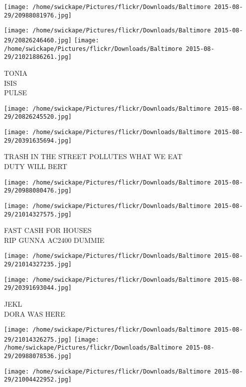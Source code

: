 \documentclass[10pt,letterpaper]{article}
\begin{document}
\texttt{[image: /home/swickape/Pictures/flickr/Downloads/Baltimore 2015-08-29/20988081976.jpg]}

\vspace{0.25in}
\texttt{[image: /home/swickape/Pictures/flickr/Downloads/Baltimore 2015-08-29/20826246460.jpg]}
\texttt{[image: /home/swickape/Pictures/flickr/Downloads/Baltimore 2015-08-29/21021886261.jpg]}

TONIA\\
ISIS\\
PULSE\\
\pagebreak

\texttt{[image: /home/swickape/Pictures/flickr/Downloads/Baltimore 2015-08-29/20826245520.jpg]}

\vspace{0.25in}
\texttt{[image: /home/swickape/Pictures/flickr/Downloads/Baltimore 2015-08-29/20391635694.jpg]}

TRASH IN THE STREET POLLUTES WHAT WE EAT\\
DUTY WILL BERT\\
\pagebreak

\texttt{[image: /home/swickape/Pictures/flickr/Downloads/Baltimore 2015-08-29/20988080476.jpg]}

\vspace{0.25in}
\texttt{[image: /home/swickape/Pictures/flickr/Downloads/Baltimore 2015-08-29/21014327575.jpg]}

FAST CASH FOR HOUSES\\
RIP GUNNA AC2400 DUMMIE\\
\pagebreak

\texttt{[image: /home/swickape/Pictures/flickr/Downloads/Baltimore 2015-08-29/21014327235.jpg]}

\vspace{0.25in}
\texttt{[image: /home/swickape/Pictures/flickr/Downloads/Baltimore 2015-08-29/20391693044.jpg]}

JEKL\\
DORA WAS HERE\\
\pagebreak

\texttt{[image: /home/swickape/Pictures/flickr/Downloads/Baltimore 2015-08-29/21014326275.jpg]}
\texttt{[image: /home/swickape/Pictures/flickr/Downloads/Baltimore 2015-08-29/20988078536.jpg]}

\texttt{[image: /home/swickape/Pictures/flickr/Downloads/Baltimore 2015-08-29/21004422952.jpg]}
\end{document}
